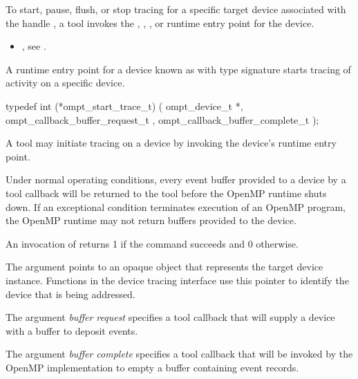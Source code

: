 To start, pause, flush, or stop tracing for a specific target device
associated with the handle , a tool invokes the 
, , , or
 runtime entry point for the device.


\crossreferences
\begin{itemize}
\item {},
see .
\end{itemize}

\label{sec:ompt_start_trace_t}

\summary
A runtime entry point for a device known as 
with type signature 
starts tracing of activity on a specific device.

\format
\begin{ccppspecific}
\begin{omptInquiry}
typedef int (*ompt_start_trace_t) (
  ompt_device_t *,
  ompt_callback_buffer_request_t ,
  ompt_callback_buffer_complete_t 
);
\end{omptInquiry}
\end{ccppspecific}

\descr
A tool may initiate tracing on a device by invoking the device's 
runtime entry point.

Under normal operating conditions, every event buffer provided to
a device by a tool callback will be returned to the tool
before the OpenMP runtime shuts down.
If an exceptional condition terminates  execution of an OpenMP
program, the OpenMP runtime may not return buffers provided to the
device.

An invocation of  returns 1 if the command
succeeds and 0 otherwise.

\argdesc
The  argument points to an opaque object that represents
the target device instance. Functions in the device tracing interface
use this pointer to identify the device that is being addressed.

The argument \emph{buffer request} specifies a tool callback
that will supply a device with a buffer to deposit events.

The argument \emph{buffer complete} specifies a tool callback
that will be invoked by the OpenMP implementation to empty a buffer
containing event records.

